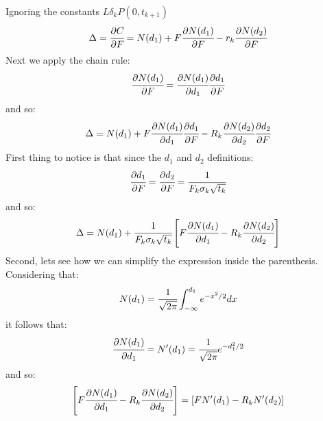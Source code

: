 \documentclass[12pt,a4paper]{exam}
\begin{document}
\begin{questions}
\begin{solution}
Ignoring the constants $L\delta_k P(0,t_{k+1})$
\begin{equation*}
\Delta =\cfrac{\partial C}{\partial F} = N(d_1) + F\cfrac{\partial N(d_1)}{\partial F} - r_k\cfrac{\partial N(d_2)}{\partial F}
\end{equation*}
Next we apply the chain rule:
\begin{equation*}
	\cfrac{\partial N(d_1)}{\partial F} = \cfrac{\partial N(d_1)}{\partial d_1}\cfrac{\partial d_1}{\partial F}
\end{equation*}
and so:
\begin{equation*}
\Delta = N(d_1) + F\cfrac{\partial N(d_1)}{\partial d_1}\cfrac{\partial d_1}{\partial F} - R_k \cfrac{\partial N(d_2)}{\partial d_2}\cfrac{\partial d_2}{\partial F}
\end{equation*}
First thing to notice is that since the $d_1$ and $d_2$ definitions:
\begin{equation*}
\cfrac{\partial d_1}{\partial F} = \cfrac{\partial d_2}{\partial F}=\cfrac{1}{F_k\sigma_k\sqrt{t_k}}
\end{equation*}
and so:
\begin{equation*}
\Delta = N(d_1) + \cfrac{1}{F_k\sigma_k\sqrt{t_k}}\left[F\cfrac{\partial N(d_1)}{\partial d_1} - R_k \cfrac{\partial N(d_2)}{\partial d_2}\right]
\end{equation*}
Second, lets see how we can simplify the expression inside the parenthesis. Considering that:
\begin{equation*}
N(d_1) = \cfrac{1}{\sqrt{2\pi}}\int_{-\infty}^{d_1} e^{-x^2/2}dx
\end{equation*}	
it follows that:
\begin{equation*}
\cfrac{\partial N(d_1)}{\partial d_1}=N'(d_1)=\cfrac{1}{\sqrt{2\pi}}e^{-d_1^2/2}
\end{equation*}
and so:
\begin{equation*}
\left[F\cfrac{\partial N(d_1)}{\partial d_1} - R_k \cfrac{\partial N(d_2)}{\partial d_2}\right] = \left[FN'(d_1)-R_kN'(d_2)\right]
\end{equation*}


\end{solution}
\end{questions}
\end{document}
